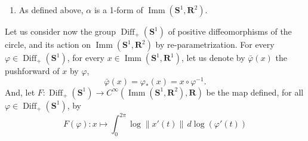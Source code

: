 \documentclass[10pt,reqno,twoside]{amsart}
\DeclareMathOperator{\Diff}{Diff}
\DeclareMathOperator{\Imm}{Imm}
\theoremstyle{plain}
\theoremstyle{definition}
\begin{document}
  \begin{enumerate}
    \item As defined above,
    $\alpha$ is a 1-form of $\Imm(\mathbf{S}^1,\mathbf{R}^2)$.
  \end{enumerate}
  
  Let us consider now the group $\Diff_+(\mathbf{S}^1)$ of positive diffeomorphisms of the circle,
  and its action on $\Imm(\mathbf{S}^1,\mathbf{R}^2)$ by re-parametrization.
  For every $\varphi \in \Diff_+(\mathbf{S}^1)$,
  for every $x \in \Imm(\mathbf{S}^1,\mathbf{R}^1)$,
  let us denote by $\bar{\varphi} (x)$ the pushforward of $x$ by $\varphi$,
  \[
  \bar{\varphi}(x) = \varphi_*(x) = x \circ \varphi^{-1}.
  \]
  And,
  let $F : \Diff_+(\mathbf{S}^1) \to C^\infty(\Imm(\mathbf{S}^1,\mathbf{R}^2),\mathbf{R})$ be the map defined,
  for all $\varphi \in \Diff_+(\mathbf{S}^1)$,
  by
  \[
  F(\varphi) : x \mapsto \int_0^{2\pi} \log \lVert x'(t)\rVert \, d\log(\varphi'(t))
  \]
  
\end{document}
